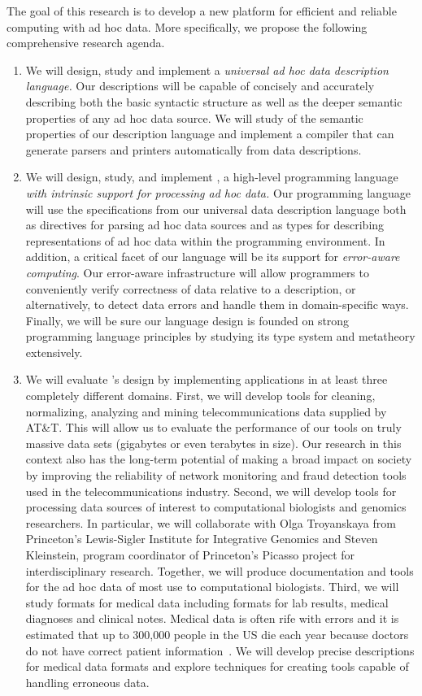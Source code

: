 \documentclass[11pt]{article}
\begin{document}
The goal of this research is to develop a new platform for
efficient and reliable computing with ad hoc data.
More specifically, we propose the following comprehensive 
research agenda.

\begin{enumerate}
\item We will design, study and implement
a {\em universal ad hoc data description language.}
Our descriptions will be capable of
concisely and accurately describing both the basic syntactic structure
as well as the deeper semantic properties of any ad hoc data source.
We will study of the semantic properties of our description language
and implement a compiler that can
generate parsers and printers 
automatically from data descriptions.

\item We will design, study, and implement  \datatype{}, a 
high-level programming language {\em with 
intrinsic support for 
processing ad hoc data.}  Our programming language will use the
specifications from our universal data description language 
both as directives for
parsing ad hoc data sources and as types for describing
representations of ad hoc data within the programming environment.  
In addition,
a critical facet of our language will be its support for
{\em error-aware computing}.  Our error-aware infrastructure 
will allow programmers to conveniently
verify correctness of data relative to a description, or 
alternatively, to detect data errors and handle them in domain-specific
ways.  Finally, we will be sure
our language design is founded on
strong programming language principles by
studying its type system and metatheory extensively. 

\item We will evaluate \datatype's design by implementing 
applications in at least three completely different domains.  First, we will
develop tools for cleaning, normalizing, analyzing and mining
telecommunications data supplied by AT\&T.  This will allow
us to evaluate the performance of our tools on truly
massive data sets (gigabytes or even terabytes in size).  
Our research in this context also has the 
long-term potential of making
a broad impact on society by improving the reliability of network
monitoring and fraud detection tools
used in the telecommunications industry.  Second, we 
will develop tools for processing data sources of 
interest to computational biologists and genomics researchers.  
In particular, we will collaborate with
Olga Troyanskaya from Princeton's Lewis-Sigler Institute for 
Integrative Genomics and Steven Kleinstein, program coordinator of Princeton's
Picasso project for interdisciplinary research.
Together, we will produce documentation and tools for the
ad hoc data of most use to computational biologists.
Third, we will study formats for medical data including
formats for lab results, medical diagnoses and clinical notes.
Medical data is often rife with errors and it is estimated that
up to 300,000 people in the US die each year because doctors 
do not have correct patient information~\cite{rudlin:pc}.
We will develop precise \datatype{} descriptions for medical data formats and
explore techniques for creating tools capable of handling erroneous data.


\end{enumerate}
\end{document}

